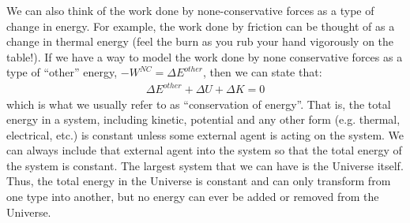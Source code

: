We can also think of the work done by none-conservative forces as a type of change in energy. For example, the work done by friction can be thought of as a change in thermal energy (feel the burn as you rub your hand vigorously on the table!). If we have a way to model the work done by none conservative forces as a type of ``other'' energy, $-W^{NC}=\Delta E^{other}$, then we can state that:
\begin{align*}
\Delta E^{other} + \Delta U + \Delta K =0
\end{align*}
which is what we usually refer to as ``conservation of energy''. That is, the total energy in a system, including kinetic, potential and any other form (e.g. thermal, electrical, etc.) is constant unless some external agent is acting on the system. We can always include that external agent into the system so that the total energy of the system is constant. The largest system that we can have is the Universe itself. Thus, the total energy in the Universe is constant and can only transform from one type into another, but no energy can ever be added or removed from the Universe.



